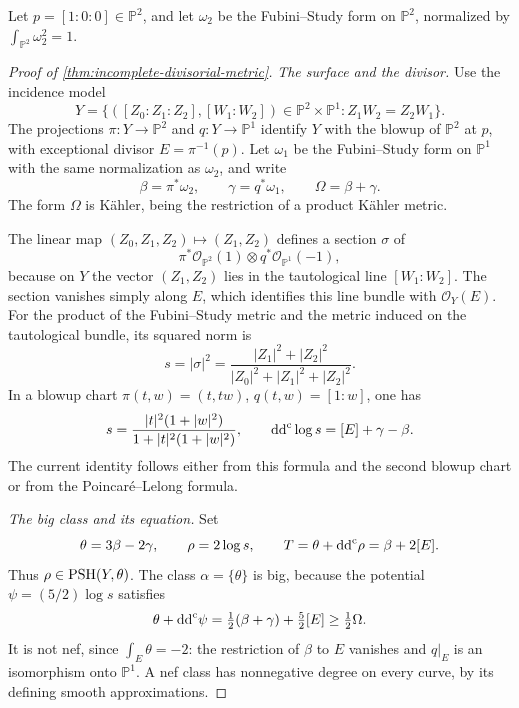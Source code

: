 Let $p=[1:0:0]\in\mathbb P^2$, and let $\omega_2$ be the Fubini--Study form on $\mathbb P^2$, normalized by $\int_{\mathbb P^2}\omega_2^2=1$.

\begin{proof}[Proof of \cref{thm:incomplete-divisorial-metric}]
\emph{The surface and the divisor.}
Use the incidence model
\[
 Y=\{([Z_0:Z_1:Z_2],[W_1:W_2])\in\mathbb P^2\times\mathbb P^1:
           Z_1W_2=Z_2W_1\}.
\]
The projections $\pi\colon Y\to\mathbb P^2$ and $q\colon Y\to\mathbb P^1$ identify $Y$ with the blowup of $\mathbb P^2$ at $p$, with exceptional divisor $E=\pi^{-1}(p)$. Let $\omega_1$ be the Fubini--Study form on $\mathbb P^1$ with the same normalization as $\omega_2$, and write
\[
 \beta=\pi^*\omega_2,\qquad \gamma=q^*\omega_1,
 \qquad \Omega=\beta+\gamma.
\]
The form $\Omega$ is K\"ahler, being the restriction of a product K\"ahler metric.

The linear map $(Z_0,Z_1,Z_2)\mapsto(Z_1,Z_2)$ defines a section $\sigma$ of
\[
 \pi^*\mathcal O_{\mathbb P^2}(1)\otimes q^*\mathcal O_{\mathbb P^1}(-1),
\]
because on $Y$ the vector $(Z_1,Z_2)$ lies in the tautological line $[W_1:W_2]$. The section vanishes simply along $E$, which identifies this line bundle with $\mathcal O_Y(E)$. For the product of the Fubini--Study metric and the metric induced on the tautological bundle, its squared norm is
\[
 s=|\sigma|^2=
 \frac{|Z_1|^2+|Z_2|^2}{|Z_0|^2+|Z_1|^2+|Z_2|^2}.
\]
In a blowup chart $\pi(t,w)=(t,tw)$, $q(t,w)=[1:w]$, one has
\begin{equation}\label{eq:incomplete-divisor-norm}
 s=\frac{|t|^2(1+|w|^2)}{1+|t|^2(1+|w|^2)},
 \qquad \mathrm{dd}^{\mathrm{c}}\log s=[E]+\gamma-\beta.
\end{equation}
The current identity follows either from this formula and the second blowup chart or from the Poincar\'e--Lelong formula.

\emph{The big class and its equation.}
Set
\begin{equation}\label{eq:incomplete-current}
 \theta=3\beta-2\gamma,\qquad \rho=2\log s,
 \qquad T=\theta+\mathrm{dd}^{\mathrm{c}}\rho=\beta+2[E].
\end{equation}
Thus $\rho\in\mathrm{PSH}(Y,\theta)$. The class $\alpha=\{\theta\}$ is big, because the potential $\psi=(5/2)\log s$ satisfies
\begin{equation}\label{eq:incomplete-strict-current}
 \theta+\mathrm{dd}^{\mathrm{c}}\psi
 =\tfrac12(\beta+\gamma)+\tfrac52[E]\geq\tfrac12\Omega.
\end{equation}
It is not nef, since $\int_E\theta=-2$: the restriction of $\beta$ to $E$ vanishes and $q|_E$ is an isomorphism onto $\mathbb P^1$. A nef class has nonnegative degree on every curve, by its defining smooth approximations.


\end{proof}
